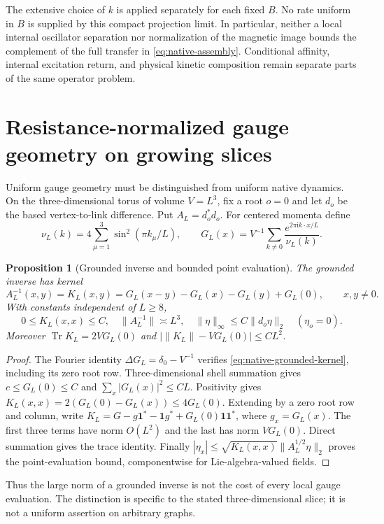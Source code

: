 \documentclass[11pt,oneside,openany]{book}
\newtheorem{proposition}[proposition]{Proposition}
\theoremstyle{definition}
\theoremstyle{remark}
\newcommand{\one}{\mathbf1}
\newcommand{\ii}{\mathrm i}
\newcommand{\Tr}{\operatorname{Tr}}
\begin{document}
The extensive choice of $k$ is applied separately for each fixed $B$.
No rate uniform in $B$ is supplied by this compact projection limit.
In particular, neither a local internal oscillator separation nor
normalization of the magnetic image bounds the complement of the
full transfer in \cref{eq:native-assembly}. Conditional affinity,
internal excitation return, and physical kinetic composition remain
separate parts of the same operator problem.

\section{Resistance-normalized gauge geometry on growing slices}
\label{sec:native-resistance-geometry}
Uniform gauge geometry must be distinguished from uniform native dynamics.
On the three-dimensional torus of volume $V=L^3$, fix a root $o=0$ and
let $d_o$ be the based vertex-to-link difference. Put $A_L=d_o^*d_o$.
For centered momenta define
\[
 \nu_L(k)=4\sum_{\mu=1}^3\sin^2(\pi k_\mu/L),\qquad
 G_L(x)=V^{-1}\sum_{k\ne0}\frac{e^{2\pi\ii k\cdot x/L}}{\nu_L(k)}.
\]

\begin{proposition}[Grounded inverse and bounded point evaluation]
\label{prop:native-resistance}
The grounded inverse has kernel
\begin{equation}
 A_L^{-1}(x,y)=K_L(x,y)
 =G_L(x-y)-G_L(x)-G_L(y)+G_L(0),\qquad x,y\ne0.
 \label{eq:native-grounded-kernel}
\end{equation}
With constants independent of $L\ge8$,
\begin{equation}
 0\le K_L(x,x)\le C,\quad
 \|A_L^{-1}\|\asymp L^3,\quad
 \|\eta\|_\infty\le C\|d_o\eta\|_2\quad(\eta_o=0).
 \label{eq:native-resistance-evaluation}
\end{equation}
Moreover $\Tr K_L=2VG_L(0)$ and
$|\|K_L\|-VG_L(0)|\le CL^2$.
\end{proposition}
\begin{proof}
The Fourier identity $\Delta G_L=\delta_0-V^{-1}$ verifies
\cref{eq:native-grounded-kernel}, including its zero root row.
Three-dimensional shell summation gives $c\le G_L(0)\le C$ and
$\sum_x|G_L(x)|^2\le CL$. Positivity gives
$K_L(x,x)=2(G_L(0)-G_L(x))\le4G_L(0)$.
Extending by a zero root row and column, write
$K_L=G-g\one^*-\one g^*+G_L(0)\one\one^*$, where
$g_x=G_L(x)$. The first three terms have norm $O(L^2)$ and the last
has norm $VG_L(0)$. Direct summation gives the trace identity.
Finally
$|\eta_x|\le\sqrt{K_L(x,x)}\|A_L^{1/2}\eta\|_2$ proves the
point-evaluation bound, componentwise for Lie-algebra-valued fields.
\end{proof}
Thus the large norm of a grounded inverse is not the cost of every
local gauge evaluation. The distinction is specific to the stated
three-dimensional slice; it is not a uniform assertion on arbitrary graphs.
\end{document}
